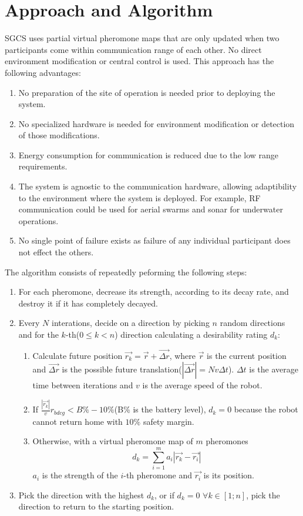 \section{Approach and Algorithm}
SGCS uses partial virtual pheromone maps that are only updated when two participants come within communication range of each other. No direct environment modification or central control is used. This approach has the following advantages: 
\begin{enumerate}
\item No preparation of the site of operation is needed prior to deploying the system.
\item No specialized hardware is needed for environment modification or detection of those modifications.
\item Energy consumption for communication is reduced due to the low range requirements.
\item The system is agnostic to the communication hardware, allowing adaptibility to the environment where the system is deployed. For example, RF communication could be used for aerial swarms and sonar for underwater operations.
\item No single point of failure exists as failure of any individual participant does not effect the others.
\end{enumerate}
The algorithm consists of repeatedly peforming the following steps:
	\begin{enumerate}
		\item For each pheromone, decrease its strength, according to its decay rate, and destroy it if it has completely decayed. 
		\item Every $N$ interations, decide on a direction by picking $n$ random directions and for the $k$-th($0\le k<n$) direction calculating a desirability rating $d_k$:
		\begin{enumerate}
			\item Calculate future position $\vec{r_k}=\vec{r} + \vec{\Delta r}$, where $\vec{r}$ is the current position and $\vec{\Delta r}$ is the possible future translation($|\vec{\Delta r}|=N v \Delta t$). $\Delta t$ is the average time between iterations and $v$ is the average speed of the robot. 
			\item If $\frac{|\vec{r_k}|}{v} r_{bdcg} < B\%-10\%$(B\% is the battery level), $d_k=0$ because the robot cannot return home with $10\%$ safety margin.
			\item Otherwise, with a virtual pheromone map of $m$ pheromones $$d_k = \sum_{i=1}^m {a_i|\vec{r_k}-\vec{r_{i}}|}$$ $a_i$ is the strength of the $i$-th pheromone and $\vec{r_{i}}$ is its position.
		\end{enumerate}
	\item Pick the direction with the highest $d_k$, or if $d_k=0$ $\forall k \in [1;n]$, pick the direction to return to the starting position.
	\end{enumerate}
